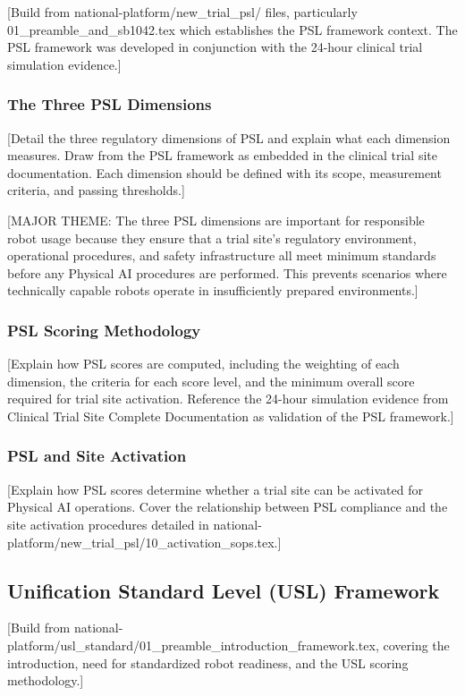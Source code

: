 [Build from national-platform/new\_trial\_psl/ files, particularly
01\_preamble\_and\_sb1042.tex which establishes the PSL framework context.
The PSL framework was developed in conjunction with the 24-hour clinical trial
simulation evidence.]

\subsubsection{The Three PSL Dimensions}
[Detail the three regulatory dimensions of PSL and explain what each
dimension measures. Draw from the PSL framework as embedded in the clinical
trial site documentation. Each dimension should be defined with its scope,
measurement criteria, and passing thresholds.]

[MAJOR THEME: The three PSL dimensions are important for responsible robot
usage because they ensure that a trial site's regulatory environment,
operational procedures, and safety infrastructure all meet minimum standards
before any Physical AI procedures are performed. This prevents scenarios where
technically capable robots operate in insufficiently prepared environments.]

\subsubsection{PSL Scoring Methodology}
[Explain how PSL scores are computed, including the weighting of each
dimension, the criteria for each score level, and the minimum overall score
required for trial site activation. Reference the 24-hour simulation
evidence from Clinical Trial Site Complete Documentation \cite{site-docs}
as validation of the PSL framework.]

\subsubsection{PSL and Site Activation}
[Explain how PSL scores determine whether a trial site can be activated for
Physical AI operations. Cover the relationship between PSL compliance and
the site activation procedures detailed in
national-platform/new\_trial\_psl/10\_activation\_sops.tex.]

\subsection{Unification Standard Level (USL) Framework}
\label{subsec:usl-framework}

[Build from national-platform/usl\_standard/01\_preamble\_introduction\_framework.tex,
covering the introduction, need for standardized robot readiness, and the
USL scoring methodology.]

